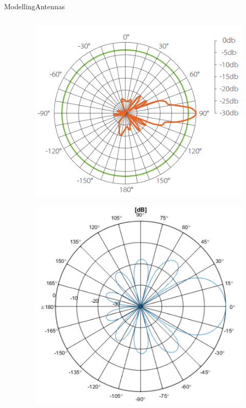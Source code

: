 \begin{frame}{Modelling}{Antennas}
\begin{columns}[T]
\begin{column}{.5\textwidth}
\begin{block}{}
      \end{block}
    \end{column}
    \begin{column}{.5\textwidth}
      \begin{figure}
        \includegraphics[scale=0.25]{figures/radpattern.png}
      \end{figure}
      \begin{figure}
        \includegraphics[scale=0.1]{figures/radpres.png}
      \end{figure}
    \end{column}
  \end{columns}
\end{frame}


